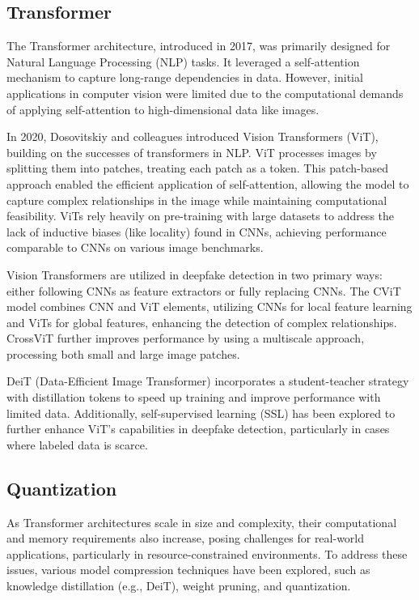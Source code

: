 \documentclass[conference]{IEEEtran}
\begin{document}
		\subsection{Transformer}
		The Transformer architecture, introduced in 2017, was primarily designed for Natural Language Processing (NLP) tasks. It leveraged a self-attention mechanism to capture long-range dependencies in data. However, initial applications in computer vision were limited due to the computational demands of applying self-attention to high-dimensional data like images.
		
		
		In 2020, Dosovitskiy and colleagues introduced Vision Transformers (ViT), building on the successes of transformers in NLP. ViT processes images by splitting them into patches, treating each patch as a token. This patch-based approach enabled the efficient application of self-attention, allowing the model to capture complex relationships in the image while maintaining computational feasibility. ViTs rely heavily on pre-training with large datasets to address the lack of inductive biases (like locality) found in CNNs, achieving performance comparable to CNNs on various image benchmarks.
		
		
		Vision Transformers are utilized in deepfake detection in two primary ways: either following CNNs as feature extractors or fully replacing CNNs. The CViT model combines CNN and ViT elements, utilizing CNNs for local feature learning and ViTs for global features, enhancing the detection of complex relationships. CrossViT further improves performance by using a multiscale approach, processing both small and large image patches.
		
		
		DeiT (Data-Efficient Image Transformer) incorporates a student-teacher strategy with distillation tokens to speed up training and improve performance with limited data. Additionally, self-supervised learning (SSL) has been explored to further enhance ViT’s capabilities in deepfake detection, particularly in cases where labeled data is scarce.
		
		\subsection{Quantization}
		As Transformer architectures scale in size and complexity, their computational and memory requirements also increase, posing challenges for real-world applications, particularly in resource-constrained environments. To address these issues, various model compression techniques have been explored, such as knowledge distillation (e.g., DeiT), weight pruning, and quantization.
		
\end{document}
